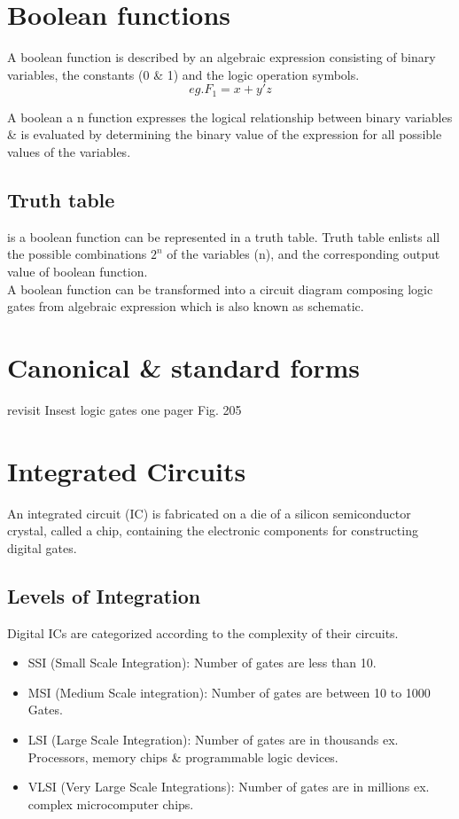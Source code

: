 \section{Boolean functions}
A boolean function is described by an algebraic expression consisting of binary variables, the constants (0 \& 1) and the logic operation symbols. 
\[eg. F_1 = x + y'z \] 

\par A boolean a n function expresses the logical relationship between binary variables \& is evaluated by determining the binary value of the expression for all possible values of the variables. 

\subsection{Truth table} is a boolean function can be represented in a 
truth table. Truth table enlists all the possible combinations \(2^n\) of the variables (n), and the corresponding output value of boolean function.\\
A boolean function can be transformed into a circuit diagram composing logic gates from algebraic expression which is also known as schematic.

\section{Canonical \& standard forms}
revisit 
Insest logic gates one pager 
Fig. 205

\section{Integrated Circuits}
An integrated circuit (IC) is fabricated on a die of a silicon semiconductor crystal, called a chip, containing the electronic components for constructing digital gates.

\subsection{Levels of Integration}
Digital ICs are categorized according to the complexity of their circuits.
\begin{itemize}
    \item SSI (Small Scale Integration): Number of gates are less than 10.
    \item MSI (Medium Scale integration): Number of gates are between 10 to 1000 Gates.
    \item LSI (Large Scale Integration): Number of gates are in thousands ex. Processors, memory chips \& programmable logic devices.
    \item VLSI (Very Large Scale Integrations): Number of gates are in millions ex. complex microcomputer chips. 
\end{itemize} 


